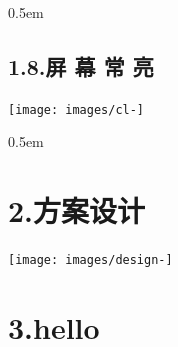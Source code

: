 \documentclass{article}
\begin{document}
\begin{mdbmargintb}{}{0.5em}%
\subsection{{1.8.\hspace*{0.5em}屏 幕 常 亮}}\label{sec--}%
\end{mdbmargintb}%

\begin{mdcenter}%

\noindent{}\texttt{[image: images/cl-]}{}%
\end{mdcenter}%

\noindent{}%

\begin{mdbmargintb}{}{0.5em}%
\section{{2.\hspace*{0.5em}方案设计}}\label{section}%
\end{mdbmargintb}%

\begin{mdcenter}%

\noindent{}\texttt{[image: images/design-]}{}%
\end{mdcenter}%

\section{3.\hspace*{0.5em}hello}\label{sec-hello}%
\end{document}
